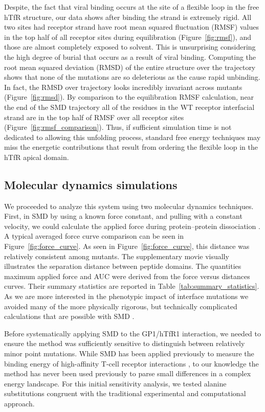 \documentclass[12pt]{article}
\begin{document}
Despite, the fact that viral binding occurs at the site of a flexible loop in the free hTfR structure, our data shows after binding the strand is extremely rigid. All two sites had receptor strand have root mean squared fluctuation (RMSF) values in the top half of all receptor sites during equilibration (Figure~\ref{fig:rmsf}), and those are almost completely exposed to solvent. This is unsurprising considering the high degree of burial that occurs as a result of viral binding. Computing the root mean squared deviation (RMSD) of the entire structure over the trajectory shows that none of the mutations are so deleterious as the cause rapid unbinding. In fact, the RMSD over trajectory looks incredibly invariant across mutants (Figure~\ref{fig:rmsd}). By comparison to the equilibration RMSF calculation, near the end of the SMD trajectory all of the residues in the WT receptor interfacial strand are in the top half of RMSF over all receptor sites (Figure~\ref{fig:rmsf_comparison}). Thus, if sufficient simulation time is not dedicated to allowing this unfolding process, standard free energy techniques may miss the energetic contributions that result from ordering the flexible loop in the hTfR apical domain.

\subsection{Molecular dynamics simulations}

We proceeded to analyze this system using two molecular dynamics techniques. First, in SMD by using a known force constant, and pulling with a constant velocity, we could calculate the applied force during protein--protein dissociation \citep{Cuendet2008,Cuendet2011}. A typical averaged force curve comparison can be seen in Figure~\ref{fig:force_curve}. As seen in Figure~\ref{fig:force_curve}, this distance was relatively consistent among mutants. The supplementary movie visually illustrates the separation distance between peptide domains. The quantities maximum applied force and AUC were derived from the force versus distances curves. Their summary statistics are reported in Table~\ref{tab:summary_statistics}. As we are more interested in the phenotypic impact of interface mutations we avoided many of the more physically rigorous, but technically complicated calculations that are possible with SMD \citep{Is2001A,Is2001B}.

Before systematically applying SMD to the GP1/hTfR1 interaction, we needed to ensure the method was sufficiently sensitive to distinguish between relatively minor point mutations. While SMD has been applied previously to measure the binding energy of high-affinity T-cell receptor interactions \citep{Cuendet2008,Cuendet2011}, to our knowledge the method has never been used previously to parse small differences in a complex energy landscape. For this initial sensitivity analysis, we tested alanine substitutions congruent with the traditional experimental and computational approach. 
\end{document}

